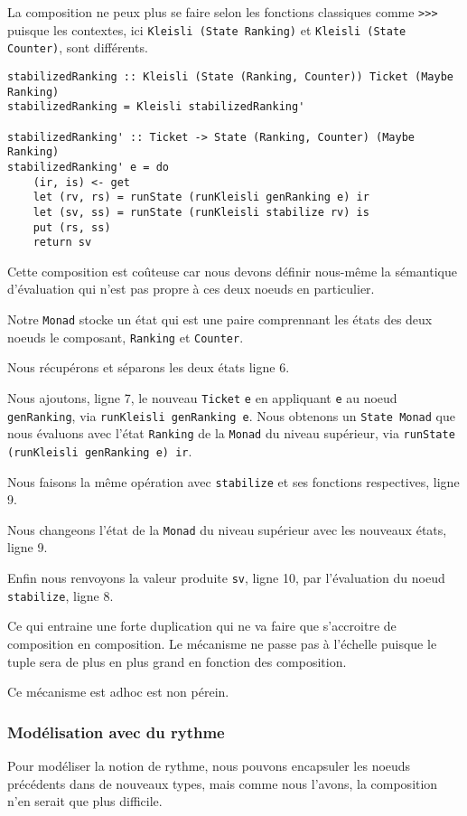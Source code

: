 \documentclass{llncs}
\begin{document}
La composition ne peux plus se faire selon les fonctions classiques comme \lstinline{>>>}
puisque les contextes, ici \lstinline{Kleisli (State Ranking)} et \lstinline{Kleisli (State Counter)},
sont différents.

\begin{lstlisting}
stabilizedRanking :: Kleisli (State (Ranking, Counter)) Ticket (Maybe Ranking)
stabilizedRanking = Kleisli stabilizedRanking'

stabilizedRanking' :: Ticket -> State (Ranking, Counter) (Maybe Ranking)
stabilizedRanking' e = do
    (ir, is) <- get
    let (rv, rs) = runState (runKleisli genRanking e) ir
    let (sv, ss) = runState (runKleisli stabilize rv) is
    put (rs, ss)
    return sv
\end{lstlisting}

Cette composition est coûteuse car nous devons définir nous-même la sémantique
d'évaluation qui n'est pas propre à ces deux noeuds en particulier.

Notre \lstinline{Monad} stocke un état qui est une paire comprennant les états
des deux noeuds le composant, \lstinline{Ranking} et \lstinline{Counter}.

Nous récupérons et séparons les deux états ligne 6.

Nous ajoutons, ligne 7, le nouveau \lstinline{Ticket} \lstinline{e} en appliquant \lstinline{e}
au noeud \lstinline{genRanking}, via \lstinline{runKleisli genRanking e}.
Nous obtenons un \lstinline{State Monad} que nous évaluons avec l'état \lstinline{Ranking}
de la \lstinline{Monad} du niveau supérieur, via \lstinline{runState (runKleisli genRanking e) ir}.

Nous faisons la même opération avec \lstinline{stabilize} et ses fonctions respectives,
ligne 9.

Nous changeons l'état de la \lstinline{Monad} du niveau supérieur avec les nouveaux
états, ligne 9.

Enfin nous renvoyons la valeur produite \lstinline{sv}, ligne 10, par l'évaluation
du noeud \lstinline{stabilize}, ligne 8.

Ce qui entraine une forte duplication qui ne va faire que s'accroitre de
composition en composition.
Le mécanisme ne passe pas à l'échelle puisque le tuple sera de plus en plus
grand en fonction des composition.

Ce mécanisme est adhoc est non pérein.

\subsubsection{Modélisation avec du rythme}
Pour modéliser la notion de rythme, nous pouvons encapsuler les noeuds
précédents dans de nouveaux types, mais comme nous l'avons, la composition
n'en serait que plus difficile.
\end{document}
